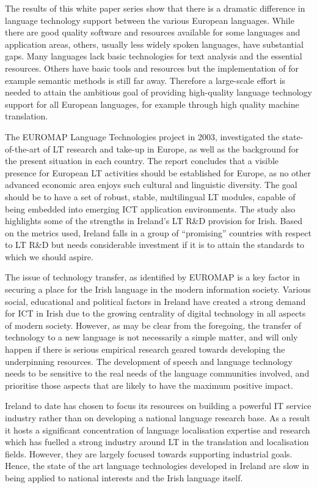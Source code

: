 \begin{multicols}{2}
The results of this white paper series show that there is a dramatic difference in language technology support between the various European languages. While there are good quality software and resources available for some languages and application areas, others, usually less widely spoken languages, have substantial gaps. Many languages lack basic technologies for text analysis and the essential resources. Others have basic tools and resources but the implementation of for example semantic methods is still far away. Therefore a large-scale effort is needed to attain the ambitious goal of providing high-quality language technology support for all European languages, for example through high quality machine translation. 

The EUROMAP Language Technologies \cite{euromap} project in 2003, investigated the state-of-the-art of LT research and take-up in Europe, as well as the background for the present situation in each country. The report concludes that a visible presence for European LT activities should be established for Europe, as no other advanced economic area enjoys such cultural and linguistic diversity. The goal should be to have a set of robust, stable, multilingual LT modules, capable of being embedded into emerging ICT application environments. The study also highlights some of the strengths in Ireland’s  LT R\&D provision for Irish. Based on the metrics used, Ireland falls in a group of ``promising'' countries with respect to LT R\&D but  needs considerable investment if it is to attain the standards to which we should aspire.

The issue of technology transfer, as identified by EUROMAP is a key factor in securing a place for the Irish language in the modern information society. Various social, educational and political factors in Ireland have created a strong demand for ICT in Irish due to the growing centrality of digital technology in all aspects of modern society. However, as may be clear from the foregoing, the transfer of technology to a new language is not necessarily a simple matter, and will only happen if there is serious empirical research geared towards developing the underpinning resources. The development of speech and language technology needs to be sensitive to the real needs of the language communities involved, and prioritise those aspects that are likely to have the maximum positive impact.

Ireland to date has chosen to focus its resources on building a powerful IT service industry rather than on developing a national language research base. As a result it hosts a significant concentration of language localisation expertise and research which has fuelled a strong industry around LT in the translation and localisation fields. However, they are largely focused towards supporting industrial goals. Hence, the state of the art language technologies developed in Ireland are slow in being applied to national interests and the Irish language itself.


\end{multicols}
